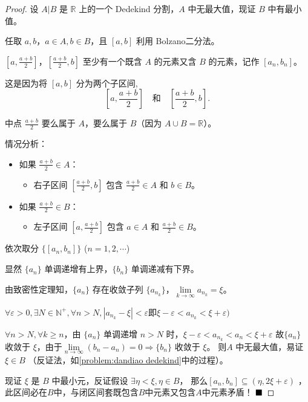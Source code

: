     \begin{proof}
        设 $A|B$ 是 $\mathbb{R}$ 上的一个 Dedekind 分割，$A$ 中无最大值，现证 $B$ 中有最小值。
        
        任取 $a, b$，$a \in A, b \in B$，且 $[a, b]$ 利用 Bolzano二分法。
        
        $[a, \frac{a+b}{2}]$，$[\frac{a+b}{2}, b]$ 至少有一个既含 $A$ 的元素又含 $B$ 的元素，记作 $[a_n, b_n]$。

        这是因为将 $[a,b]$ 分为两个子区间,
        $$
        \left[a, \frac{a+b}{2}\right] \quad \text{和} \quad \left[\frac{a+b}{2}, b\right].
        $$ 

        中点 $\frac{a+b}{2}$ 要么属于 $A$，要么属于 $B$（因为 $A \cup B = \mathbb{R}$）。

        情况分析：
        \begin{itemize}
            \item 如果 $\frac{a+b}{2} \in A$：
                \begin{itemize}
                    \item 右子区间 $\left[\frac{a+b}{2}, b\right]$ 包含 $\frac{a+b}{2} \in A$ 和 $b \in B$。
                \end{itemize}
            \item 如果 $\frac{a+b}{2} \in B$：
            \begin{itemize}
                \item 左子区间 $\left[a, \frac{a+b}{2}\right]$ 包含 $a \in A$ 和 $\frac{a+b}{2} \in B$。
            \end{itemize}
        \end{itemize}

        
        依次取分 $\{[a_n, b_n]\}$ ($n=1,2,\cdots$)
        
        显然 $\{a_n\}$ 单调递增有上界，$\{b_n\}$ 单调递减有下界。
        
        由致密性定理知，$\{a_n\}$ 存在收敛子列 $\{a_{n_k}\}$，$\lim\limits_{k \to \infty} a_{n_k} = \xi$。
        
        $\forall \varepsilon > 0 ,\exists N \in \mathbb{N}^+ ,\forall n > N ,|a_{n_k} - \xi| < \varepsilon $即$ \xi - \varepsilon < a_{n_k} < \xi + \varepsilon)$
        
        $\forall n > N ,\forall k \geq n$，由 $\{a_n\}$ 单调递增 $n > N$ 时，$\xi - \varepsilon < a_{n_k} < a_n < \xi + \varepsilon$
        故$\{a_n\}$ 收敛于 $\xi$，由于$\lim\limits_{n \to \infty} (b_n - a_n) = 0 \Rightarrow \{b_n\}$ 收敛于 $\xi$。
        则$A$ 中无最大值，易证 $\xi \in B$ （反证法，如\ref{problem:dandiao dedekind}中的过程）。
        
        现证 $\xi$ 是 $B$ 中最小元，反证假设 $\exists \eta < \xi ,\eta \in B$，
        那么$[a_n, b_n] \subseteq (\eta, 2\xi + \varepsilon)$ ，此区间必在$B$中，与闭区间套既包含$B$中元素又包含$A$中元素矛盾！ $\hfill \blacksquare$
    \end{proof}
        
